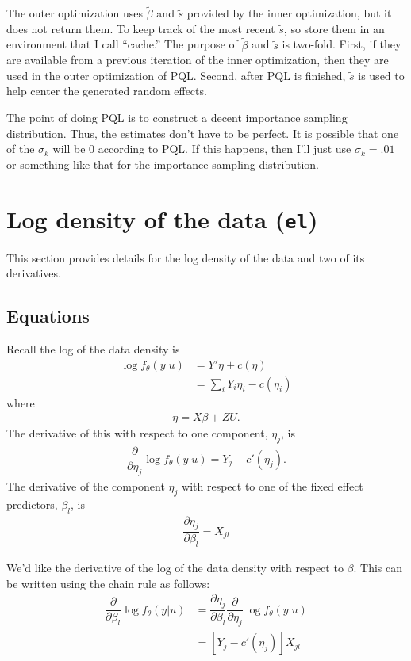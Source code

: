\documentclass{article}
\begin{document}
The outer optimization  uses $\tilde{\beta}$ and $\tilde{s}$ provided by the inner optimization, but it does not return them. To keep track of the most recent  $\tilde{s}$, so store them in an environment that I call ``cache.''  The purpose of  $\tilde{\beta}$ and $\tilde{s}$ is two-fold. First, if they are available from a previous iteration of the inner optimization, then they are used in the outer optimization of PQL.  Second, after PQL is finished, $\tilde{s}$ is used to help center the generated random effects.


The point of doing PQL is to construct a decent importance sampling distribution. Thus, the estimates don't have to be perfect.  It is possible that one of the $\sigma_k$ will be 0 according to PQL. If this happens, then I'll just use $\sigma_k = .01$ or something like that for the importance sampling distribution.




\section{Log density of the data (\texttt{el})}\label{sec:el}
This section provides details for the log density of the data and two of its derivatives.  

\subsection{Equations}
Recall the log of the data density is
\begin{align}
\log f_\theta(y|u) &= Y' \eta +c(\eta) \\
&= \sum_{i} Y_{i} {\eta_{i}} - c({\eta_{i}})
\end{align}
where
\begin{align}
\eta=X\beta+ZU.
\end{align}
The derivative of this with respect to one component, $\eta_j$, is
\begin{align}
\dfrac{\partial}{\partial \eta_j} \log f_\theta(y|u)  = Y_j-c'(\eta_j).
\end{align}
The derivative of the component $\eta_j$ with respect to one of the fixed effect predictors, $\beta_{l}$, is
\begin{align}
\dfrac{\partial \eta_j}{\partial \beta_{l}} = X_{j{l}}
\end{align}

We'd like the derivative of the log of the data density with respect to $\beta$. This can be written using the chain rule as follows:
\begin{align}
\dfrac{\partial}{\partial \beta_{l}}  \log f_\theta(y|u) &= \dfrac{\partial \eta_j}{\partial \beta_{l}} \dfrac{\partial}{\partial \eta_j} \log f_\theta(y|u) \\
&= \left[ Y_j-c'(\eta_j) \right]  X_{j{l}}
\end{align}
\end{document}
